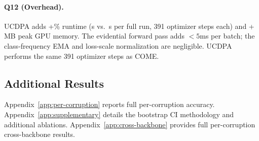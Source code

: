 \paragraph{Q12 (Overhead).}
UCDPA adds +\ucdpaRuntimeOverhead\% runtime (\ucdpaRuntime{}s vs.\ \comeRuntime{}s per full run, 391 optimizer steps each) and +\ucdpaMemOverhead{} MB peak GPU memory. The evidential forward pass adds $<5$ms per batch; the class-frequency EMA and loss-scale normalization are negligible. UCDPA performs the same 391 optimizer steps as COME.

\subsection{Additional Results}
\label{sec:exp:additional}

Appendix~\ref{app:per-corruption} reports full per-corruption accuracy. Appendix~\ref{app:supplementary} details the bootstrap CI methodology and additional ablations. Appendix~\ref{app:cross-backbone} provides full per-corruption cross-backbone results.
